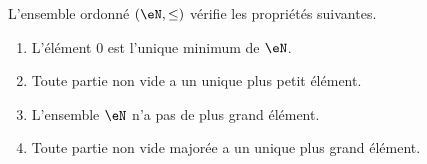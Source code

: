 \begin{proposition}     \label{PROPooMZOWooHmsXzI}
	L'ensemble ordonné \( (\eN,\leq)\) vérifie les propriétés suivantes.
	\begin{enumerate}
		\item       \label{ITEMooJLAHooDKukfH}
		      L'élément \( 0\) est l'unique minimum de \( \eN\).
		\item       \label{ITEMooYAJIooEFmOpB}
		      Toute partie non vide a un unique plus petit élément.
		\item       \label{ITEMooSRGOooNYJJHY}
		      L'ensemble \( \eN\) n'a pas de plus grand élément.
		\item       \label{ITEMooKIHZooDRTCdx}
		      Toute partie non vide majorée a un unique plus grand élément.
	\end{enumerate}
\end{proposition}

